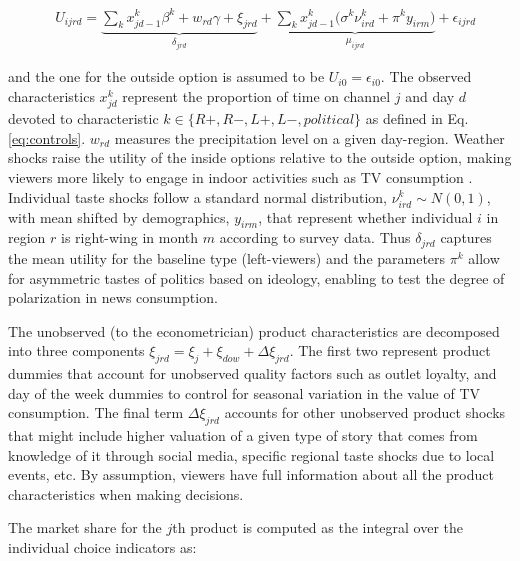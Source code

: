 \documentclass[12pt]{article}
\begin{document}
	
	\begin{equation}\label{eq:utility}
		\begin{aligned}
			& U_{ijrd}= \underbrace{\sum_k x_{jd-1}^k\beta^k+w_{rd}   \gamma  +  \xi_{jrd}}_{\delta_{jrd}}  + \underbrace{  \sum_k x_{jd-1}^k \Big( \sigma^k \nu_{ird}^k  + \pi^ky_{irm} \Big)}_{\mu_{ijrd}}+\epsilon_{ijrd} 
		\end{aligned}
	\end{equation} 
	
	and the one for the outside option is assumed to be $U_{i0}=\epsilon_{i0}$. The observed characteristics $ x_{jd}^k $ represent the  proportion of time on channel $ j $ and day $ d$ devoted to characteristic $ k \in \{R+,R-,L+,L-,political\}$ as defined in Eq. \eqref{eq:controls}. $w_{rd}$ measures the precipitation level on a given day-region. Weather shocks raise the utility of the inside options  relative to the outside option, making viewers more likely to engage in indoor activities such as TV consumption \citep{wilbur}. Individual taste shocks follow a standard normal distribution, $ \nu_{ird}^k \sim N(0,1)$, with mean shifted by  demographics, $ y_{irm} $, that represent whether individual $i$ in region $r$ is right-wing in month $m$ according to survey data.	Thus $\delta_{jrd}$ captures the mean utility for the baseline type (left-viewers) and the parameters $\pi^k$ allow for asymmetric tastes of politics based on ideology, enabling to test the degree of polarization in news consumption. 

The unobserved (to the econometrician) product characteristics are decomposed into  three components $\xi_{jrd}= \xi_j + \xi_{dow} + \Delta \xi_{jrd}$. The first two represent product dummies that account for unobserved quality factors such as outlet loyalty, and day of the week dummies to control for  seasonal variation in the value of TV consumption. The final term $ \Delta \xi_{jrd}$ accounts for other unobserved product shocks that might include higher valuation of a given type of story that comes from knowledge of it through social media, specific regional taste shocks due to local events, etc. By assumption, viewers have full information about all the product characteristics when making decisions. %


The market share for the $j$th product is computed as the integral over the individual choice indicators as: 
	
\end{document}
